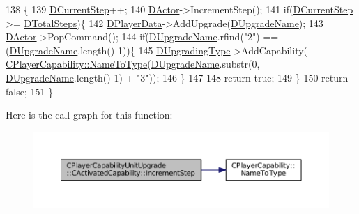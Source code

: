 \begin{DoxyCode}
138                                                                     \{
139     \hyperlink{classCPlayerCapabilityUnitUpgrade_1_1CActivatedCapability_a3ffaf9372ee622c3ef439396dfd00db6}{DCurrentStep}++;
140     \hyperlink{classCActivatedPlayerCapability_a54ca944b47bff2718330639941d402b0}{DActor}->IncrementStep();
141     \textcolor{keywordflow}{if}(\hyperlink{classCPlayerCapabilityUnitUpgrade_1_1CActivatedCapability_a3ffaf9372ee622c3ef439396dfd00db6}{DCurrentStep} >= \hyperlink{classCPlayerCapabilityUnitUpgrade_1_1CActivatedCapability_a56d9f9fd76c8757955e84ae8f56d5337}{DTotalSteps})\{
142         \hyperlink{classCActivatedPlayerCapability_a9bf27c322a73f4b11c8183cc1973c3d8}{DPlayerData}->AddUpgrade(\hyperlink{classCPlayerCapabilityUnitUpgrade_1_1CActivatedCapability_acb0261591d692393b3c864d75edc799f}{DUpgradeName});
143         \hyperlink{classCActivatedPlayerCapability_a54ca944b47bff2718330639941d402b0}{DActor}->PopCommand();
144         \textcolor{keywordflow}{if}(\hyperlink{classCPlayerCapabilityUnitUpgrade_1_1CActivatedCapability_acb0261591d692393b3c864d75edc799f}{DUpgradeName}.rfind(\textcolor{stringliteral}{"2"}) == (\hyperlink{classCPlayerCapabilityUnitUpgrade_1_1CActivatedCapability_acb0261591d692393b3c864d75edc799f}{DUpgradeName}.length()-1))\{
145             \hyperlink{classCPlayerCapabilityUnitUpgrade_1_1CActivatedCapability_a028e222f2adc8a1035090487c93b358b}{DUpgradingType}->AddCapability(
      \hyperlink{classCPlayerCapability_a920a696526e8a839f728192aea0ba1c5}{CPlayerCapability::NameToType}(\hyperlink{classCPlayerCapabilityUnitUpgrade_1_1CActivatedCapability_acb0261591d692393b3c864d75edc799f}{DUpgradeName}.substr(0, 
      \hyperlink{classCPlayerCapabilityUnitUpgrade_1_1CActivatedCapability_acb0261591d692393b3c864d75edc799f}{DUpgradeName}.length()-1) + \textcolor{stringliteral}{"3"}));
146         \}
147         
148         \textcolor{keywordflow}{return} \textcolor{keyword}{true};    
149     \}
150     \textcolor{keywordflow}{return} \textcolor{keyword}{false};
151 \}
\end{DoxyCode}
Here is the call graph for this function\+:\nopagebreak
\begin{figure}[H]
\begin{center}
\leavevmode
\includegraphics[width=350pt]{classCPlayerCapabilityUnitUpgrade_1_1CActivatedCapability_a86833312cb2f2460e923808fe0e19223_cgraph}
\end{center}
\end{figure}
